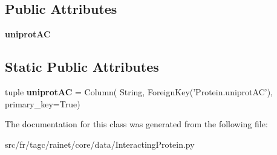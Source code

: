 \subsection*{Public Attributes}
\begin{DoxyCompactItemize}
\item 
\hypertarget{classsrc_1_1fr_1_1tagc_1_1rainet_1_1core_1_1data_1_1InteractingProtein_1_1InteractingProtein_af6e40087a910a5e1daf8b55c2e07b987}{{\bfseries uniprot\-A\-C}}\label{classsrc_1_1fr_1_1tagc_1_1rainet_1_1core_1_1data_1_1InteractingProtein_1_1InteractingProtein_af6e40087a910a5e1daf8b55c2e07b987}

\end{DoxyCompactItemize}
\subsection*{Static Public Attributes}
\begin{DoxyCompactItemize}
\item 
\hypertarget{classsrc_1_1fr_1_1tagc_1_1rainet_1_1core_1_1data_1_1InteractingProtein_1_1InteractingProtein_a63ff91371a3e6c44631bfb46f42e84c7}{tuple {\bfseries uniprot\-A\-C} = Column( String, Foreign\-Key('Protein.\-uniprot\-A\-C'), primary\-\_\-key=True)}\label{classsrc_1_1fr_1_1tagc_1_1rainet_1_1core_1_1data_1_1InteractingProtein_1_1InteractingProtein_a63ff91371a3e6c44631bfb46f42e84c7}

\end{DoxyCompactItemize}


The documentation for this class was generated from the following file\-:\begin{DoxyCompactItemize}
\item 
src/fr/tagc/rainet/core/data/Interacting\-Protein.\-py\end{DoxyCompactItemize}
